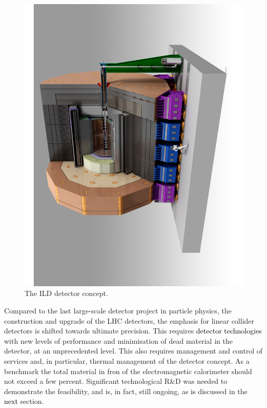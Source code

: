 \documentclass[%
 reprint,
 amsmath,amssymb,
 aps,
]{revtex4-1}
\newcommand{\jim}[1]{\textcolor{black}{#1}}
\begin{document}
\begin{figure}[tb]
 \begin{center}
 \includegraphics[width=0.7\hsize,angle=-90]{figures/ILD.pdf}
\caption{The ILD detector concept.
\label{fig_ild}}
 \end{center}
 \end{figure}
 

Compared to the last large-scale detector project in particle physics, the construction and upgrade of the LHC detectors, the emphasis for linear collider detectors is shifted towards ultimate precision. This requires \jim{detector technologies} 
with new levels of performance and minimisation of dead material in the detector, at an unprecedented level. This also requires management and control of services and, in particular, thermal management of the detector concept. As a benchmark the total material in fron of the electromagnetic calorimeter should not exceed a few percent. Significant technological R\&D was needed to demonstrate the feasibility, and is, in fact, still ongoing, as \jim{is} discussed in the \jim{next} section.  
\end{document}
